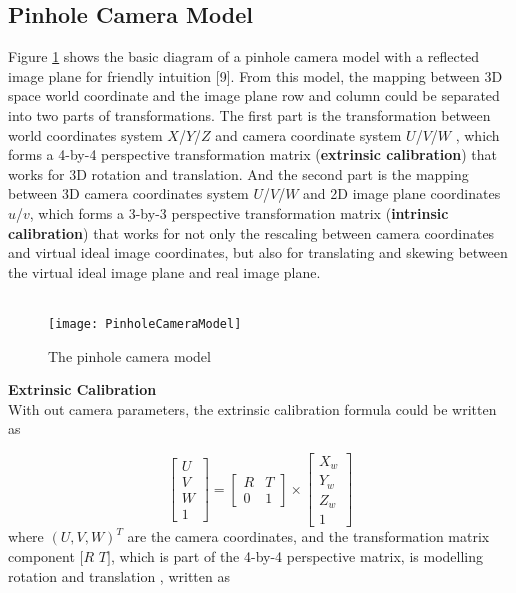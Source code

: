 \subsection{Pinhole Camera Model}
Figure \ref{PinholeCameraModel} shows the basic diagram of a pinhole camera model with a reflected image plane for friendly intuition
[9].%
From this model, the mapping between 3D space world coordinate and the image plane row and column could be separated into two parts of transformations. The first part is the transformation between world coordinates system \(X\)/\(Y\)/\(Z\) and camera coordinate system \(U\)/\(V\)/\(W\) , which forms a 4-by-4 perspective transformation matrix (\textbf{extrinsic calibration}) that works for 3D rotation and translation. And the second part is the mapping between 3D camera coordinates system \(U\)/\(V\)/\(W\) and 2D image plane coordinates  \(u\)/\(v\), which forms a 3-by-3 perspective transformation matrix (\textbf{intrinsic calibration}) that works for not only the rescaling between camera coordinates and virtual ideal image coordinates, but also for translating and skewing between the virtual ideal image plane and real image plane.  \\\\\par

\begin{figure}[h]
\centering
\texttt{[image: PinholeCameraModel]}
\caption{The pinhole camera model}
\label{PinholeCameraModel}
\end{figure}%
%
\textbf{Extrinsic Calibration}\\
With out camera parameters, the extrinsic calibration formula could be written as

\begin{equation}
%
\left[ \begin{array}{c} U \\ V \\ W \\ 1 \end{array} \right] %
= %
\begin{bmatrix} R & T \\ 0 & 1 \end{bmatrix} \times \left[ \begin{array}{c} X_w \\ Y_w \\ Z_w \\ 1 \end{array} \right]
%
\end{equation}
%
where \((U, V, W)^T\) are the camera coordinates, and the transformation matrix component \([R\)  \(T]\), which is part of the 4-by-4 perspective matrix, is modelling rotation and translation , written as

